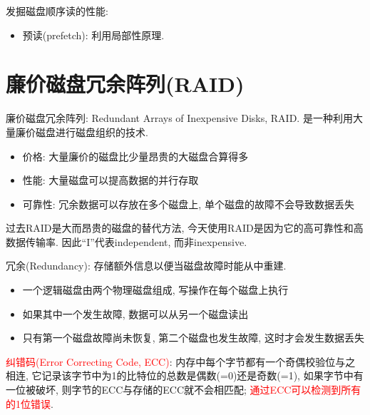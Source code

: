 发掘磁盘顺序读的性能:
\begin{itemize}
    \item 预读(prefetch): 利用局部性原理.
\end{itemize}


\section{廉价磁盘冗余阵列(RAID)}

廉价磁盘冗余阵列: Redundant Arrays of Inexpensive Disks, RAID. 是一种利用大量廉价磁盘进行磁盘组织的技术.
\begin{itemize}
    \item 价格: 大量廉价的磁盘比少量昂贵的大磁盘合算得多
    \item 性能: 大量磁盘可以提高数据的并行存取
    \item 可靠性: 冗余数据可以存放在多个磁盘上, 单个磁盘的故障不会导致数据丢失
\end{itemize}
\begin{remark}
    过去RAID是大而昂贵的磁盘的替代方法, 今天使用RAID是因为它的高可靠性和高数据传输率. 因此``I''代表independent, 而非inexpensive.
\end{remark}

\begin{definition}[冗余(Redundancy)]
    冗余(Redundancy): 存储额外信息以便当磁盘故障时能从中重建.
\end{definition}

\begin{definition}[镜像冗余]
    \begin{itemize}
        \item 一个逻辑磁盘由两个物理磁盘组成, 写操作在每个磁盘上执行
        \item 如果其中一个发生故障, 数据可以从另一个磁盘读出
        \item 只有第一个磁盘故障尚未恢复, 第二个磁盘也发生故障, 这时才会发生数据丢失
    \end{itemize}
\end{definition}

\begin{definition}[校验码冗余]
    \textcolor{red}{纠错码(Error Correcting Code, ECC)}: 内存中每个字节都有一个奇偶校验位与之相连, 它记录该字节中为1的比特位的总数是偶数(=0)还是奇数(=1), 如果字节中有一位被破坏, 则字节的ECC与存储的ECC就不会相匹配; \textcolor{red}{通过ECC可以检测到所有的1位错误}.
\end{definition}

